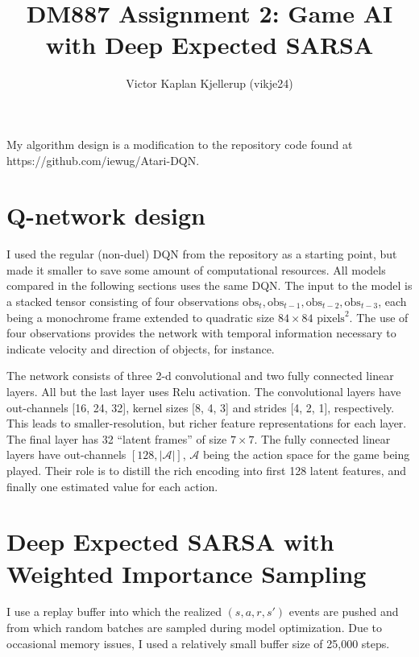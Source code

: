 \documentclass{article}
\begin{document}
\title{DM887 Assignment 2: Game AI with Deep Expected SARSA}
\author{Victor Kaplan Kjellerup (vikje24)}
\date{}  %
\maketitle


My algorithm design is a modification to the repository code found at https://github.com/iewug/Atari-DQN.

\section{Q-network design}
I used the regular (non-duel) DQN from the repository as a starting point, but made it smaller to save some amount of computational resources. All models compared in the following sections uses the same DQN. The input to the model is a stacked tensor consisting of four observations \(\text{obs}_t, \text{obs}_{t-1}, \text{obs}_{t-2}, \text{obs}_{t-3}\), each being a monochrome frame extended to quadratic size \(84 \times 84\) \(\text{pixels}^2\). The use of four observations provides the network with temporal information necessary to indicate velocity and direction of objects, for instance.

The network consists of three 2-d convolutional and two fully connected linear layers. All but the last layer uses Relu activation. The convolutional layers have out-channels [16, 24, 32], kernel sizes [8, 4, 3] and strides [4, 2, 1], respectively. This leads to smaller-resolution, but richer feature representations for each layer. The final layer has 32 ``latent frames'' of size \(7 \times 7\). The fully connected linear layers have out-channels \([128, |\mathcal{A}|]\), \(\mathcal{A}\) being the action space for the game being played. Their role is to distill the rich encoding into first 128 latent features, and finally one estimated value for each action.

\section{Deep Expected SARSA with Weighted Importance Sampling}
I use a replay buffer into which the realized \((s, a, r, s')\) events are pushed and from which random batches are sampled during model optimization. Due to occasional memory issues, I used a relatively small buffer size of 25,000 steps.
\end{document}
